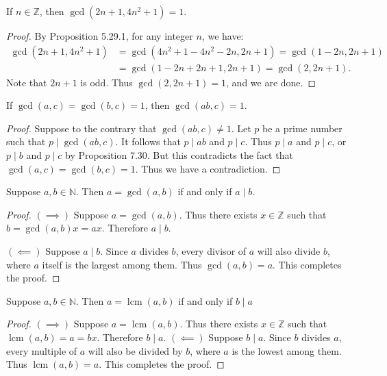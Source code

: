 \documentclass{exam}
\DeclareMathOperator{\lcm}{lcm}
\begin{document}
\begin{proposition}{7.33}
    If $n\in\mathbb Z$, then $\gcd(2n + 1, 4n^2 + 1)=1$.
\end{proposition}

\begin{proof}
    By Proposition 5.29.1, for any integer $n$, we have:
    \begin{align*}
        \gcd(2n+1,4n^2+1)&=\gcd(4n^2+1-4n^2-2n,2n+1)=\gcd(1-2n,2n+1)\\
        &=\gcd(1-2n + 2n + 1, 2n + 1)=\gcd(2, 2n + 1).
    \end{align*}
    Note that $2n + 1$ is odd. Thus $\gcd(2, 2n + 1) = 1$, and we are done.
\end{proof}

\begin{proposition}{7.34}
    If $\gcd(a, c) = \gcd(b, c) = 1$, then $\gcd(ab, c) = 1$.
\end{proposition}

\begin{proof}
    Suppose to the contrary that $\gcd(ab, c) \neq 1$. Let $p$ be a prime number such that $p \mid \gcd(ab, c)$. It follows that $p\mid ab$ and $p\mid c$. Thus $p\mid a$ and $p\mid c$, or $p\mid b$ and $p\mid c$ by Proposition 7.30. But this contradicts the fact that $\gcd(a, c) = \gcd(b, c) = 1$. Thus we have a contradiction.
\end{proof}

\begin{proposition}{7.35}
    Suppose $a, b\in\mathbb N$. Then $a = \gcd(a, b)$ if and only if $a\mid b$.
\end{proposition}

\begin{proof}
    $(\implies)$ Suppose $a = \gcd(a, b)$. Thus there exists $x\in\mathbb Z$ such that $b = \gcd(a, b)x = ax$. Therefore $a \mid b$.

    $(\impliedby)$ Suppose $a \mid b$. Since $a$ divides $b$, every divisor of $a$ will also divide $b$, where $a$ itself is the largest among them. Thus $\gcd(a, b) = a$. This completes the proof.
\end{proof}

\begin{proposition}{7.36}
    Suppose $a,b\in\mathbb N$. Then $a=\lcm(a, b)$ if and only if $b \mid a$
\end{proposition}

\begin{proof}
    $(\implies)$ Suppose $a = \lcm(a,b)$. Thus there exists $x\in\mathbb Z$ such that $\lcm(a, b) = a = bx$. Therefore $b \mid a$.
    $(\impliedby)$ Suppose $b\mid a$. Since $b$ divides $a$, every multiple of $a$ will also be divided by $b$, where $a$ is the lowest among them. Thus $\lcm(a, b) = a$. This completes the proof.
\end{proof}
\end{document}

